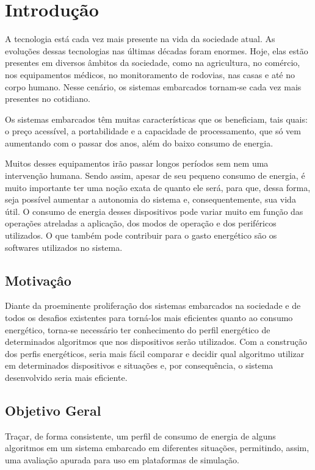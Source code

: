 \chapter{Introdução}\label{CAP:introducao}

A tecnologia está cada vez mais presente na vida da sociedade atual. As evoluções dessas tecnologias nas últimas décadas foram enormes. Hoje, elas estão presentes em diversos âmbitos da sociedade, como na agricultura, no comércio, nos equipamentos médicos, no monitoramento de rodovias, nas casas e até no corpo humano. Nesse cenário, os sistemas embarcados tornam-se cada vez mais presentes no cotidiano.

Os sistemas embarcados têm muitas características que os beneficiam, tais quais: o preço acessível, a portabilidade e a capacidade de processamento, que só vem aumentando com o passar dos anos, além do baixo consumo de energia. 
            
Muitos desses equipamentos irão passar longos períodos sem nem uma intervenção humana. Sendo assim, apesar de seu pequeno consumo de energia, é muito importante ter uma noção exata de quanto ele será, para que, dessa forma, seja possível aumentar a autonomia do sistema e, consequentemente, sua vida útil. O consumo de energia desses dispositivos pode variar muito em função das operações atreladas a aplicação, dos modos de operação e dos periféricos utilizados. O que também pode contribuir para o gasto energético são os softwares utilizados no sistema.	
      
\section{Motivaçâo}
Diante da proeminente proliferação dos sistemas embarcados na sociedade e de todos os desafios existentes para torná-los mais eficientes quanto ao consumo energético, torna-se necessário ter conhecimento do perfil energético de determinados algoritmos que nos dispositivos serão utilizados. Com a construção dos perfis energéticos, seria mais fácil comparar e decidir qual algoritmo utilizar em determinados dispositivos e situações e, por consequência, o sistema desenvolvido seria mais eficiente.

\section{Objetivo Geral}
Traçar, de forma consistente, um perfil de consumo de energia de alguns algoritmos em um sistema embarcado em diferentes situações, permitindo, assim, uma avaliação apurada para uso em plataformas de simulação.

